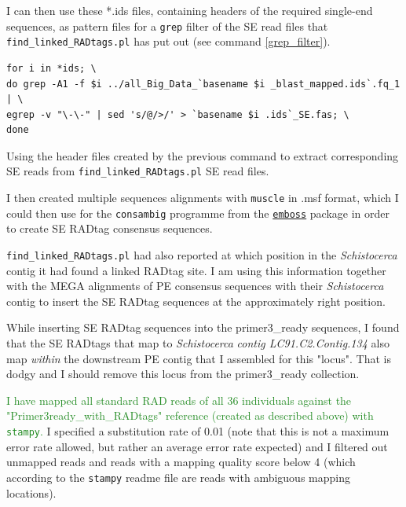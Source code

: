 \documentclass{article}\usepackage[]{graphicx}\usepackage[]{color}
\newcommand{\roger}[1]{ \textcolor[named]{ForestGreen}{#1} }
\begin{document}
I can then use these *.ids files, containing headers of the required single-end sequences, as pattern files for a \texttt{grep} filter of the SE read files that \texttt{find\_linked\_RADtags.pl} has put out (see command \ref{grep_filter}).

\begin{command}
\captionsetup{type=command}
\begin{Verbatim}
for i in *ids; \
do grep -A1 -f $i ../all_Big_Data_`basename $i _blast_mapped.ids`.fq_1 | \
egrep -v "\-\-" | sed 's/@/>/' > `basename $i .ids`_SE.fas; \
done
\end{Verbatim}
\caption{Using the header files created by the previous command to extract corresponding SE reads from \texttt{find\_linked\_RADtags.pl} SE read files.}
\label{grep_filter}
\end{command}

I then created multiple sequences alignments with \texttt{muscle} in .msf format, which I could then use for the \texttt{consambig} programme from the \href{http://emboss.sourceforge.net/apps/release/6.6/emboss/apps/consambig.html}{\texttt{emboss}} package in order to create SE RADtag consensus sequences.

\texttt{find\_linked\_RADtags.pl} had also reported at which position in the \textit{Schistocerca} contig it had found a linked RADtag site. I am using this information together with the MEGA alignments of PE consensus sequences with their \textit{Schistocerca} contig to insert the SE RADtag sequences at the approximately right position. 

While inserting SE RADtag sequences into the primer3\_ready sequences, I found that the SE RADtags that map to \textit{Schistocerca} {\color{red}\textit{contig LC91.C2.Contig.134}} also map \emph{within} the downstream PE contig that I assembled for this "locus". That is dodgy and I should remove this locus from the primer3\_ready collection.

\roger{I have mapped all standard RAD reads of all 36 individuals against the "Primer3ready\_with\_RADtags" reference (created as described above) with \texttt{stampy}.} I specified a substitution rate of 0.01 (note that this is not a maximum error rate allowed, but rather an average error rate expected) and I filtered out unmapped reads and reads with a mapping quality score below 4 (which according to the \texttt{stampy} readme file are reads with ambiguous mapping locations).
\end{document}
